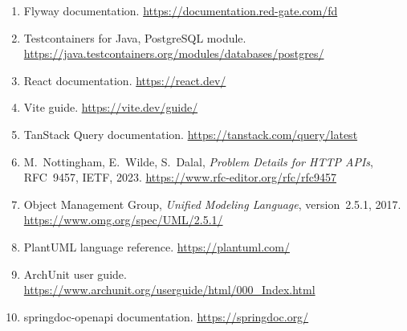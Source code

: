 {\begin{enumerate}
  \item Flyway documentation. \url{https://documentation.red-gate.com/fd}
  \item Testcontainers for Java, PostgreSQL module. \url{https://java.testcontainers.org/modules/databases/postgres/}
  \item React documentation. \url{https://react.dev/}
  \item Vite guide. \url{https://vite.dev/guide/}
  \item TanStack Query documentation. \url{https://tanstack.com/query/latest}
  \item M.~Nottingham, E.~Wilde, S.~Dalal, \emph{Problem Details for HTTP APIs}, RFC~9457, IETF, 2023. \url{https://www.rfc-editor.org/rfc/rfc9457}
  \item Object Management Group, \emph{Unified Modeling Language}, version~2.5.1, 2017. \url{https://www.omg.org/spec/UML/2.5.1/}
  \item PlantUML language reference. \url{https://plantuml.com/}
  \item ArchUnit user guide. \url{https://www.archunit.org/userguide/html/000_Index.html}
  \item springdoc-openapi documentation. \url{https://springdoc.org/}
\end{enumerate}
\par}
